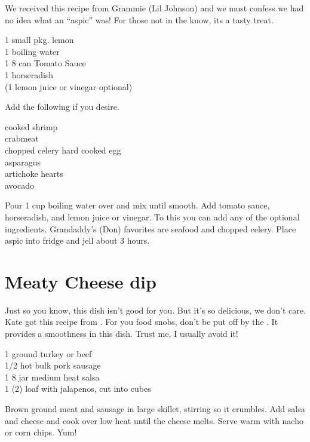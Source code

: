 \begin{open}
  We received this recipe from Grammie (Lil Johnson) and we must confess
  we had no idea what an ``aspic'' was!  For those not in the know, its a tasty
  treat.
\end{open}
\begin{ingredients}
  1 small pkg. lemon \\
  \SI{1}{\cup} boiling water \\
  1 \SI{8}{\ounce} can  Tomato Sauce \\
  \SI{1}{\teaspoon} horseradish \\
  (\SI{1}{\teaspoon} lemon juice or vinegar optional)  \\
\end{ingredients}
Add the following if you desire.
\begin{ingredients}
  cooked shrimp \\
  crabmeat \\
  chopped celery
  hard cooked egg \\
  asparagus \\
  artichoke hearts \\
  avocado \\
\end{ingredients}
Pour 1 cup boiling water over  and mix until smooth. Add tomato
sauce, horseradish, and lemon juice or vinegar.  To this you can add any of
the optional ingredients. Grandaddy's (Don) favorites are seafood and chopped
celery. Place aspic into fridge and jell about 3 hours.

\section{Meaty Cheese dip}

\begin{open}
  Just so you know, this dish isn't good for you. But it's so delicious,
  we don't care. Kate got this recipe from .  For you
  food snobs, don't be put off by the .  It provides a
  smoothness in this dish. Trust me, I usually avoid it!
\end{open}
\begin{ingredients}
  \SI{1}{\pound} ground turkey or beef\\
  \SI{1/2}{\pound} hot bulk pork sausage\\
  1 \SI{8}{\ounce} jar medium heat salsa\\
  1 (\SI{2}{\pound}) loaf  with jalapenos, cut into cubes
\end{ingredients}
Brown ground meat and sausage in large skillet, stirring so it crumbles. Add
salsa and cheese and cook over low heat until the cheese melts. Serve warm
with nacho or corn chips. Yum!

